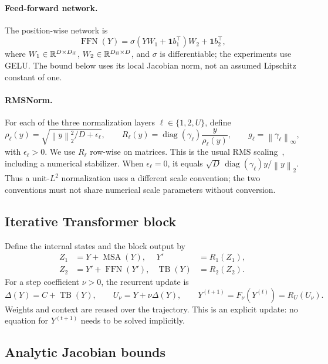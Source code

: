 \documentclass[11pt]{article}
\newcommand{\R}{\mathbb{R}}
\newcommand{\MSA}{\operatorname{MSA}}
\newcommand{\FFN}{\operatorname{FFN}}
\newcommand{\TB}{\operatorname{TB}}
\newcommand{\diag}{\operatorname{diag}}
\newcommand{\norm}[1]{\left\|#1\right\|}
\numberwithin{equation}{section}
\begin{document}
\paragraph{Feed-forward network.}
The position-wise network is
\begin{equation}
\FFN(Y)=\sigma(YW_1+\mathbf{1}b_1^\top)W_2+\mathbf{1}b_2^\top,
\end{equation}
where $W_1\in\R^{D\times D_{\rm ff}}$, $W_2\in\R^{D_{\rm ff}\times D}$,
and $\sigma$ is differentiable; the experiments use GELU. The bound below uses its local Jacobian norm,
not an assumed Lipschitz constant of one.

\paragraph{RMSNorm.}
For each of the three normalization layers $\ell\in\{1,2,U\}$, define
\begin{equation}\label{eq:rms}
\rho_\ell(y)=\sqrt{\norm{y}_2^2/D+\epsilon_\ell},\qquad
R_\ell(y)=\diag(\gamma_\ell)\frac{y}{\rho_\ell(y)},\qquad
g_\ell=\norm{\gamma_\ell}_\infty,
\end{equation}
with $\epsilon_\ell>0$. We use $R_\ell$ row-wise on matrices. This is the usual
RMS scaling~\cite{zhang2019rmsnorm}, including a numerical stabilizer. When
$\epsilon_\ell=0$, it equals $\sqrt D\,\diag(\gamma_\ell)y/\norm{y}_2$.
Thus a unit-$L^2$ normalization uses a different scale convention; the two
conventions must not share numerical scale parameters without conversion.

\subsection{Iterative Transformer block}
Define the internal states and the block output by
\begin{align}
Z_1&=Y+\MSA(Y),&Y'&=R_1(Z_1),\label{eq:first}\\
Z_2&=Y'+\FFN(Y'),&\TB(Y)&=R_2(Z_2).\label{eq:second}
\end{align}
For a step coefficient $\nu>0$, the recurrent update is
\begin{equation}\label{eq:full}
\Delta(Y)=C+\TB(Y),\qquad
U_\nu=Y+\nu\Delta(Y),\qquad
Y^{(t+1)}=F_\nu(Y^{(t)})=R_U(U_\nu).
\end{equation}
Weights and context are reused over the trajectory. This is an explicit update:
no equation for $Y^{(t+1)}$ needs to be solved implicitly.

\subsection{Analytic Jacobian bounds}
\end{document}
